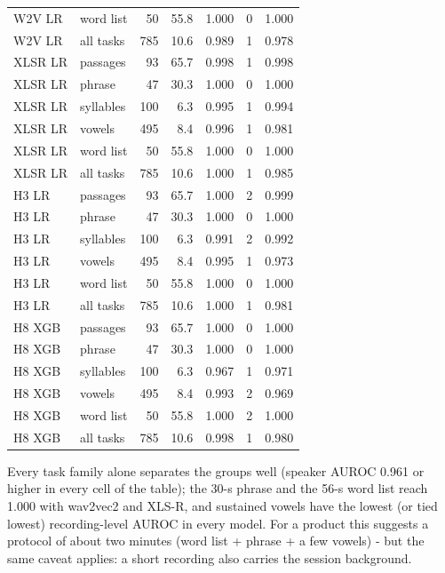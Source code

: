 \documentclass[10pt,a4paper]{article}
\begin{document}
\begin{center}
\begin{longtable}{llrrrrr}
W2V LR & word list & 50 & 55.8 & 1.000 & 0 & 1.000\\
W2V LR & all tasks & 785 & 10.6 & 0.989 & 1 & 0.978\\
XLSR LR & passages & 93 & 65.7 & 0.998 & 1 & 0.998\\
XLSR LR & phrase & 47 & 30.3 & 1.000 & 0 & 1.000\\
XLSR LR & syllables & 100 & 6.3 & 0.995 & 1 & 0.994\\
XLSR LR & vowels & 495 & 8.4 & 0.996 & 1 & 0.981\\
XLSR LR & word list & 50 & 55.8 & 1.000 & 0 & 1.000\\
XLSR LR & all tasks & 785 & 10.6 & 1.000 & 1 & 0.985\\
H3 LR & passages & 93 & 65.7 & 1.000 & 2 & 0.999\\
H3 LR & phrase & 47 & 30.3 & 1.000 & 0 & 1.000\\
H3 LR & syllables & 100 & 6.3 & 0.991 & 2 & 0.992\\
H3 LR & vowels & 495 & 8.4 & 0.995 & 1 & 0.973\\
H3 LR & word list & 50 & 55.8 & 1.000 & 0 & 1.000\\
H3 LR & all tasks & 785 & 10.6 & 1.000 & 1 & 0.981\\
H8 XGB & passages & 93 & 65.7 & 1.000 & 0 & 1.000\\
H8 XGB & phrase & 47 & 30.3 & 1.000 & 0 & 1.000\\
H8 XGB & syllables & 100 & 6.3 & 0.967 & 1 & 0.971\\
H8 XGB & vowels & 495 & 8.4 & 0.993 & 2 & 0.969\\
H8 XGB & word list & 50 & 55.8 & 1.000 & 2 & 1.000\\
H8 XGB & all tasks & 785 & 10.6 & 0.998 & 1 & 0.980\\
\end{longtable}\end{center}
Every task family alone separates the groups well (speaker AUROC 0.961 or higher in every cell of the table); the 30-s phrase and the 56-s word list reach 1.000 with wav2vec2 and XLS-R, and sustained vowels have the lowest (or tied lowest) recording-level AUROC in every model. For a product this suggests a protocol of about two minutes (word list + phrase + a few vowels) - but the same caveat applies: a short recording also carries the session background.
\end{document}

